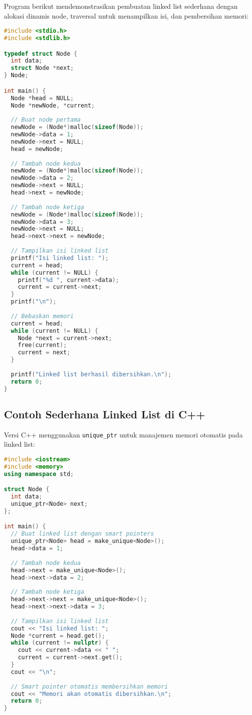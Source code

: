 \documentclass[../main.tex]{subfiles}
\begin{document}
Program berikut mendemonstrasikan pembuatan linked list sederhana dengan alokasi dinamis node, traversal untuk menampilkan isi, dan pembersihan memori:

\begin{lstlisting}[language=C, caption={Linked list sederhana di C}]
#include <stdio.h>
#include <stdlib.h>

typedef struct Node {
  int data;
  struct Node *next;
} Node;

int main() {
  Node *head = NULL;
  Node *newNode, *current;
  
  // Buat node pertama
  newNode = (Node*)malloc(sizeof(Node));
  newNode->data = 1;
  newNode->next = NULL;
  head = newNode;
  
  // Tambah node kedua
  newNode = (Node*)malloc(sizeof(Node));
  newNode->data = 2;
  newNode->next = NULL;
  head->next = newNode;
  
  // Tambah node ketiga
  newNode = (Node*)malloc(sizeof(Node));
  newNode->data = 3;
  newNode->next = NULL;
  head->next->next = newNode;
  
  // Tampilkan isi linked list
  printf("Isi linked list: ");
  current = head;
  while (current != NULL) {
    printf("%d ", current->data);
    current = current->next;
  }
  printf("\n");
  
  // Bebaskan memori
  current = head;
  while (current != NULL) {
    Node *next = current->next;
    free(current);
    current = next;
  }
  
  printf("Linked list berhasil dibersihkan.\n");
  return 0;
}
\end{lstlisting}

\subsection{Contoh Sederhana Linked List di C++}

Versi C++ menggunakan \texttt{unique\_ptr} untuk manajemen memori otomatis pada linked list:

\begin{lstlisting}[language=C++, caption={Linked list sederhana di C++}]
#include <iostream>
#include <memory>
using namespace std;

struct Node {
  int data;
  unique_ptr<Node> next;
};

int main() {
  // Buat linked list dengan smart pointers
  unique_ptr<Node> head = make_unique<Node>();
  head->data = 1;
  
  // Tambah node kedua
  head->next = make_unique<Node>();
  head->next->data = 2;
  
  // Tambah node ketiga
  head->next->next = make_unique<Node>();
  head->next->next->data = 3;
  
  // Tampilkan isi linked list
  cout << "Isi linked list: ";
  Node *current = head.get();
  while (current != nullptr) {
    cout << current->data << " ";
    current = current->next.get();
  }
  cout << "\n";
  
  // Smart pointer otomatis membersihkan memori
  cout << "Memori akan otomatis dibersihkan.\n";
  return 0;
}
\end{lstlisting}
\end{document}
